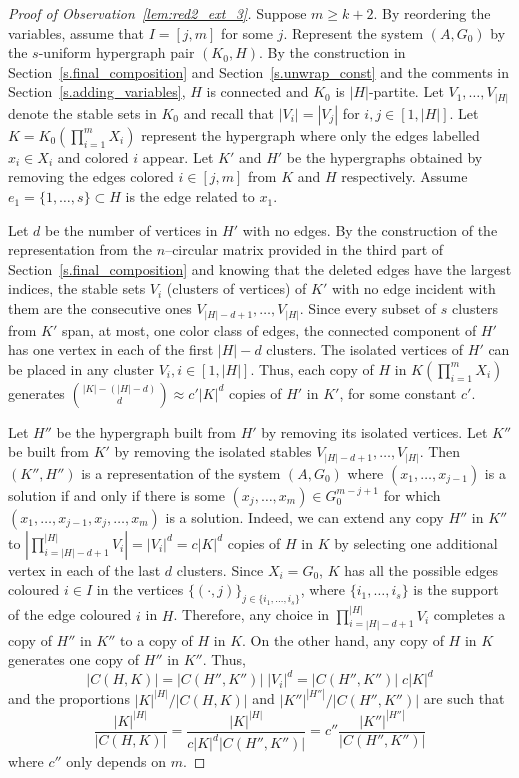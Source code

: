 \documentclass[10pt]{article}
\begin{document}
\begin{proof}[Proof of Observation~\ref{lem:red2_ext_3}] Suppose $m\geq k+2$.
	By reordering the variables, assume that $I=[j,m]$ for some $j$. Represent the system $(A,G_0)$ by the $s$-uniform hypergraph pair $(K_0,H)$. By the construction in Section~\ref{s.final_composition} and Section~\ref{s.unwrap_const} and the comments in Section~\ref{s.adding_variables}, $H$ is connected and $K_0$ is $|H|$-partite. Let $V_1,\ldots,V_{|H|}$ denote the stable sets in $K_0$ and recall that $|V_i|=|V_j|$ for $i,j\in[1,|H|]$. Let $K=K_0\left(\prod_{i=1}^m X_i\right)$ represent the hypergraph where only the edges labelled $x_i\in X_i$ and colored $i$ appear. Let $K'$ and $H'$ be the hypergraphs obtained  by removing the edges colored $i\in[j,m]$ from $K$ and $H$ respectively. Assume $e_1=\{1,\ldots,s\}\subset H$ is the edge related to $x_1$.


Let $d$ be the number of vertices in $H'$ with no edges. By the construction of the representation from the $n$--circular matrix provided in the third part of Section~\ref{s.final_composition} and knowing that the deleted edges have the largest indices, the stable sets $V_i$ (clusters of vertices) of $K'$ with no edge incident with them are the consecutive ones $V_{|H|-d+1},\ldots,V_{|H|}$.
Since every subset of $s$ clusters from $K'$ span, at most, one color class of edges, the connected component of $H'$ has one vertex in each of the first $|H|-d$ clusters. The isolated vertices of $H'$ can be placed in any cluster
$V_i, i\in[1,|H|]$.
Thus, each copy of $H$ in $K\left(\prod_{i=1}^m X_i\right)$ generates ${|K|-(|H|-d) \choose d}\approx c'|K|^d$ copies of $H'$ in $K'$, for some constant $c'$.


Let $H''$ be the hypergraph built from $H'$ by removing its isolated vertices. Let $K''$ be built from $K'$ by removing the isolated stables $V_{|H|-d+1},\ldots,V_{|H|}$. Then $(K'',H'')$ is a representation of the system $(A,G_0)$ where $(x_1,\ldots,x_{j-1})$ is a solution if and only if there is some $(x_j,\ldots,x_m)\in G_0^{m-j+1}$ for which $(x_1,\ldots,x_{j-1},x_j,\ldots,x_m)$ is a solution. Indeed, we can extend any copy $H''$ in $K''$ to $\left|\prod_{i=|H|-d+1}^{|H|} V_i\right|=|V_i|^d=c|K|^d$ copies of $H$ in $K$ by selecting one additional vertex in each of the last $d$ clusters.
Since $X_i=G_0$, $K$ has all the possible edges coloured $i\in I$ in the vertices $\{(\cdot,j)\}_{j\in \{i_1,\ldots,i_s\}}$, where $\{i_1,\ldots,i_s\}$ is the support of the edge coloured $i$ in $H$. Therefore, any choice in $\prod_{i=|H|-d+1}^{|H|} V_i$ completes a copy of $H''$ in $K''$ to a copy of $H$ in $K$.
 On the other hand, any copy of $H$ in $K$ generates one copy of $H''$ in $K''$. Thus,
\begin{displaymath}
	|C(H, K)|=|C(H'', K'')| \;|V_i|^d=|C(H'', K'')|\; c|K|^d
\end{displaymath}
and the proportions $|K|^{|H|}/|C(H, K)|$ and $|K''|^{|H''|}/|C(H'', K'')|$ are such that
\begin{displaymath}
	\frac{|K|^{|H|}}{|C(H, K)|}=\frac{|K|^{|H|}}{c|K|^d |C(H'', K'')|}=c''\frac{|K''|^{|H''|}}{|C(H'', K'')|}
\end{displaymath}
where $c''$ only depends on $m$. 


\end{proof}
\end{document}

